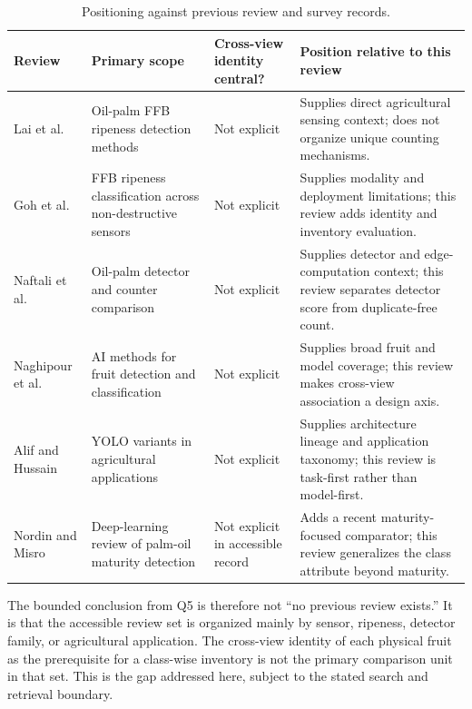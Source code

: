 \begin{table}[t]
\centering
\caption{Positioning against previous review and survey records.}
\label{tab:position2}
\scriptsize
\begin{tabularx}{\columnwidth}{@{}p{}p{}p{}Y@{}}
\toprule
Review & Primary scope & Cross-view identity central? & Position relative to this review\\
\midrule
Lai et al. \cite{lai2023palmslr} & Oil-palm FFB ripeness detection methods & Not explicit & Supplies direct agricultural sensing context; does not organize unique counting mechanisms.\\
Goh et al. \cite{goh2025palmreview} & FFB ripeness classification across non-destructive sensors & Not explicit & Supplies modality and deployment limitations; this review adds identity and inventory evaluation.\\
Naftali et al. \cite{naftali2024palmcounter} & Oil-palm detector and counter comparison & Not explicit & Supplies detector and edge-computation context; this review separates detector score from duplicate-free count.\\
Naghipour et al. \cite{naghipour2024fruitreview} & AI methods for fruit detection and classification & Not explicit & Supplies broad fruit and model coverage; this review makes cross-view association a design axis.\\
Alif and Hussain \cite{sapkota2024yoloagri} & YOLO variants in agricultural applications & Not explicit & Supplies architecture lineage and application taxonomy; this review is task-first rather than model-first.\\
Nordin and Misro \cite{nordin2026palmslr} & Deep-learning review of palm-oil maturity detection & Not explicit in accessible record & Adds a recent maturity-focused comparator; this review generalizes the class attribute beyond maturity.\\
\bottomrule
\end{tabularx}
\end{table}

The bounded conclusion from Q5 is therefore not ``no previous review exists.'' It is that the accessible review set is organized mainly by sensor, ripeness, detector family, or agricultural application. The cross-view identity of each physical fruit as the prerequisite for a class-wise inventory is not the primary comparison unit in that set. This is the gap addressed here, subject to the stated search and retrieval boundary.

